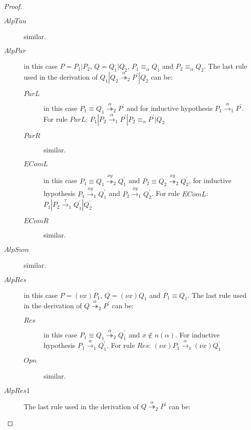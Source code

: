 \begin{theorem}
\begin{proof}
\begin{description}
       \item[$AlpTau$]
 	similar.
       \item[$AlpPar$]
 	in this case $P=P_{1}|P_{2}$, $Q=Q_{1}|Q_{2}$, $P_{1} \equiv_{\alpha} Q_{1}$ and $P_{2} \equiv_{\alpha} Q_{2}$. The last rule used in the derivation of $Q_{1}|Q_{2} \stackrel{\alpha}{\twoheadrightarrow}_{2} P^{'}|Q_{2}$ can be:
 	\begin{description}
 	  \item[$ParL$]
 	    in this case $P_{1}\equiv Q_{1} \stackrel{\alpha}{\twoheadrightarrow}_{2} P^{'}$ and for inductive hypothesis $P_{1} \xrightarrow{\alpha}_{1} P^{'}$. For rule $ParL$: $P_{1}|P_{2} \xrightarrow{\alpha}_{1} P^{'}|P_{2} \equiv_{\alpha} P^{'}|Q_{2}$
 	  \item[$ParR$]
 	    similar.
 	  \item[$EComL$]
 	    in this case $P_{1}\equiv Q_{1} \stackrel{xy}{\twoheadrightarrow}_{2} Q_{1}^{'}$ and $P_{2}\equiv Q_{2} \stackrel{\overline{x}y}{\twoheadrightarrow}_{2} Q_{2}^{'}$, for inductive hypothesis $P_{1} \xrightarrow{xy}_{1} Q_{1}^{'}$ and $P_{2} \xrightarrow{\overline{x}y}_{1} Q_{2}^{'}$. For rule $EComL$: $P_{1}|P_{2} \xrightarrow{\tau}_{1} Q_{1}^{'}|Q_{2}^{'}$
 	  \item[$EComR$]
 	    similar.
 	\end{description}
       \item[$AlpSum$]
 	similar.
       \item[$AlpRes$]
 	in this case $P=(\nu x)P_{1}$, $Q=(\nu x)Q_{1}$ and $P_{1} \equiv Q_{1}$. The last rule used in the derivation of $Q \stackrel{\alpha}{\twoheadrightarrow}_{2} P^{'}$ can be:
 	\begin{description}
 	  \item[$Res$]
 	    in this case $P_{1}\equiv Q_{1} \stackrel{\alpha}{\twoheadrightarrow}_{2} Q_{1}^{'}$ and $x\notin n(\alpha)$. For inductive hypothesis $P_{1} \xrightarrow{\alpha}_{1} Q_{1}^{'}$. For rule $Res$: $(\nu x)P_{1} \xrightarrow{\alpha}_{1} (\nu x)Q_{1}^{'}$
 	  \item[$Opn$]
 	    similar.
 	\end{description}
      \item[$AlpRes1$]
 	The last rule used in the derivation of $Q \stackrel{\alpha}{\twoheadrightarrow}_{2} P^{'}$ can be:
 	\begin{description}
 	  \item[$Res$]:
 	    \begin{center}
 	      $\inferrule* [left=\bf{Alp}]{
 		  \inferrule* [left=\bf{AlpRes1}]{
}}
\end{center}
\end{description}
\end{description}
\end{proof}
\end{theorem}

